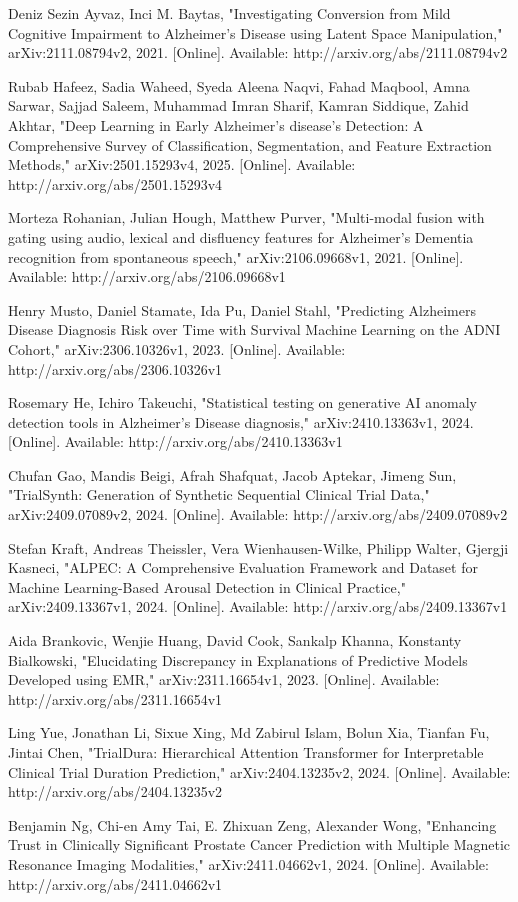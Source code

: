 \documentclass[conference]{IEEEtran}
\begin{document}
\begin{thebibliography}{99}
 Deniz Sezin Ayvaz, Inci M. Baytas, "Investigating Conversion from Mild Cognitive Impairment to Alzheimer's Disease using Latent Space Manipulation," arXiv:2111.08794v2, 2021. [Online]. Available: http://arxiv.org/abs/2111.08794v2

 Rubab Hafeez, Sadia Waheed, Syeda Aleena Naqvi, Fahad Maqbool, Amna Sarwar, Sajjad Saleem, Muhammad Imran Sharif, Kamran Siddique, Zahid Akhtar, "Deep Learning in Early Alzheimer's disease's Detection: A Comprehensive Survey of Classification, Segmentation, and Feature Extraction Methods," arXiv:2501.15293v4, 2025. [Online]. Available: http://arxiv.org/abs/2501.15293v4

 Morteza Rohanian, Julian Hough, Matthew Purver, "Multi-modal fusion with gating using audio, lexical and disfluency features for Alzheimer's Dementia recognition from spontaneous speech," arXiv:2106.09668v1, 2021. [Online]. Available: http://arxiv.org/abs/2106.09668v1

 Henry Musto, Daniel Stamate, Ida Pu, Daniel Stahl, "Predicting Alzheimers Disease Diagnosis Risk over Time with Survival Machine Learning on the ADNI Cohort," arXiv:2306.10326v1, 2023. [Online]. Available: http://arxiv.org/abs/2306.10326v1

 Rosemary He, Ichiro Takeuchi, "Statistical testing on generative AI anomaly detection tools in Alzheimer's Disease diagnosis," arXiv:2410.13363v1, 2024. [Online]. Available: http://arxiv.org/abs/2410.13363v1

 Chufan Gao, Mandis Beigi, Afrah Shafquat, Jacob Aptekar, Jimeng Sun, "TrialSynth: Generation of Synthetic Sequential Clinical Trial Data," arXiv:2409.07089v2, 2024. [Online]. Available: http://arxiv.org/abs/2409.07089v2

 Stefan Kraft, Andreas Theissler, Vera Wienhausen-Wilke, Philipp Walter, Gjergji Kasneci, "ALPEC: A Comprehensive Evaluation Framework and Dataset for Machine Learning-Based Arousal Detection in Clinical Practice," arXiv:2409.13367v1, 2024. [Online]. Available: http://arxiv.org/abs/2409.13367v1

 Aida Brankovic, Wenjie Huang, David Cook, Sankalp Khanna, Konstanty Bialkowski, "Elucidating Discrepancy in Explanations of Predictive Models Developed using EMR," arXiv:2311.16654v1, 2023. [Online]. Available: http://arxiv.org/abs/2311.16654v1

 Ling Yue, Jonathan Li, Sixue Xing, Md Zabirul Islam, Bolun Xia, Tianfan Fu, Jintai Chen, "TrialDura: Hierarchical Attention Transformer for Interpretable Clinical Trial Duration Prediction," arXiv:2404.13235v2, 2024. [Online]. Available: http://arxiv.org/abs/2404.13235v2

 Benjamin Ng, Chi-en Amy Tai, E. Zhixuan Zeng, Alexander Wong, "Enhancing Trust in Clinically Significant Prostate Cancer Prediction with Multiple Magnetic Resonance Imaging Modalities," arXiv:2411.04662v1, 2024. [Online]. Available: http://arxiv.org/abs/2411.04662v1


\end{thebibliography}
\end{document}
